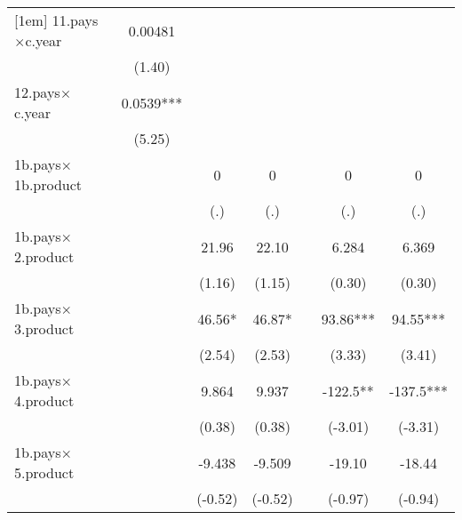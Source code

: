 {\begin{tabular}{l*{6}{c}}
[1em]
11.pays$\times$c.year      &     0.00481         &                     &                     &                     &                     &                     \\
                    &      (1.40)         &                     &                     &                     &                     &                     \\
[1em]
12.pays$\times$c.year      &      0.0539***&                     &                     &                     &                     &                     \\
                    &      (5.25)         &                     &                     &                     &                     &                     \\
[1em]
1b.pays$\times$1b.product  &                     &           0         &           0         &                     &           0         &           0         \\
                    &                     &         (.)         &         (.)         &                     &         (.)         &         (.)         \\
[1em]
1b.pays$\times$2.product   &                     &       21.96         &       22.10         &                     &       6.284         &       6.369         \\
                    &                     &      (1.16)         &      (1.15)         &                     &      (0.30)         &      (0.30)         \\
[1em]
1b.pays$\times$3.product   &                     &       46.56*  &       46.87*  &                     &       93.86***&       94.55***\\
                    &                     &      (2.54)         &      (2.53)         &                     &      (3.33)         &      (3.41)         \\
[1em]
1b.pays$\times$4.product   &                     &       9.864         &       9.937         &                     &      -122.5** &      -137.5***\\
                    &                     &      (0.38)         &      (0.38)         &                     &     (-3.01)         &     (-3.31)         \\
[1em]
1b.pays$\times$5.product   &                     &      -9.438         &      -9.509         &                     &      -19.10         &      -18.44         \\
                    &                     &     (-0.52)         &     (-0.52)         &                     &     (-0.97)         &     (-0.94)         \\

\end{tabular}}
